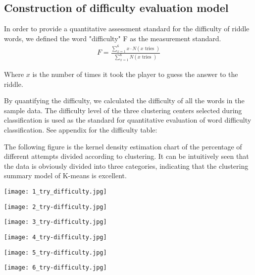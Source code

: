 \documentclass{mcmthesis}
\begin{document}
\subsection{Construction of difficulty evaluation model}
In order to provide a quantitative assessment standard for the difficulty of riddle words, we defined the word "difficulty" F as the measurement standard.
\begin{eqnarray}
	F  =  \frac{\sum_{x = 1}^{6} x \cdot N(x \text { tries })}{\sum_{x  =  1}^{6} N(x \text { tries })}
\end{eqnarray}

Where $x$ is the number of times it took the player to guess the answer to the riddle.

By quantifying the difficulty, we calculated the difficulty of all the words in the sample data. The difficulty level of the three clustering centers selected during classification is used as the standard for quantitative evaluation of word difficulty classification. See appendix for the difficulty table:


The following figure is the kernel density estimation chart of the percentage of different attempts divided according to clustering. It can be intuitively seen that the data is obviously divided into three categories, indicating that the clustering summary model of K-means is excellent.
\begin{figure*}[htbp] %
	\begin{minipage}[t]{0.33\linewidth} %
		\centering
		\texttt{[image: 1\_try\_difficulty.jpg]} %
	\end{minipage}%
	\begin{minipage}[t]{0.33\linewidth}
		\centering
		\texttt{[image: 2\_try-difficulty.jpg]}
	\end{minipage}%
	\begin{minipage}[t]{0.33\linewidth}
		\centering
		\texttt{[image: 3\_try-difficulty.jpg]}
	\end{minipage}
\end{figure*}
\begin{figure*}[htbp] %
	\begin{minipage}[t]{0.33\linewidth} %
		\centering
		\texttt{[image: 4\_try-difficulty.jpg]} %
	\end{minipage}%
	\begin{minipage}[t]{0.33\linewidth}
		\centering
		\texttt{[image: 5\_try-difficulty.jpg]}
	\end{minipage}%
	\begin{minipage}[t]{0.33\linewidth}
		\centering
		\texttt{[image: 6\_try-difficulty.jpg]}
	\end{minipage}
\end{figure*}
\end{document}
